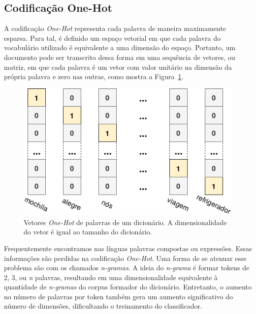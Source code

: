 \subsection{Codificação One-Hot}

A codificação \textit{One-Hot} representa cada palavra de maneira maximamente
esparsa.
Para tal, é definido um espaço vetorial em que cada palavra do vocabulário
utilizado é equivalente a uma dimensão do espaço.
Portanto, um documento pode ser transcrito dessa forma em uma sequência de
vetores, ou matriz, em que cada palavra é um vetor com valor unitário na
dimensão da própria palavra e zero nas outras, como mostra a
Figura~\ref{fig:onehot}.

\begin{figure}[h]
\begin{center} {
    \begin{center}
    \includegraphics[scale=0.30]{images/onehot.png}
    \caption{Vetores \textit{One-Hot} de palavras de um dicionário.
             A dimensionalidade do vetor é igual ao tamanho do dicionário.}
    \label{fig:onehot}
    \end{center}
}
\end{center}
\end{figure}

Frequentemente encontramos nas línguas palavras compostas ou expressões.
Essas informações são perdidas na codificação \textit{One-Hot}.
Uma forma de se atenuar esse problema são com os chamados \textit{n-gramas}.
A ideia do \textit{n-grama} é formar tokens de 2, 3, ou \textit{n} palavras,
resultando em uma dimensionalidade equivalente à quantidade de
\textit{n-gramas} do corpus formador do dicionário.
Entretanto, o aumento no número de palavras por token também gera um aumento
significativo do número de dimensões, dificultando o treinamento do
classificador.

